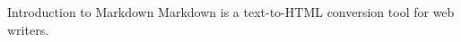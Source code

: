 \begin{frame}{Introduction to Markdown}
Markdown is a text-to-HTML conversion tool for web writers. 
    
\end{frame}